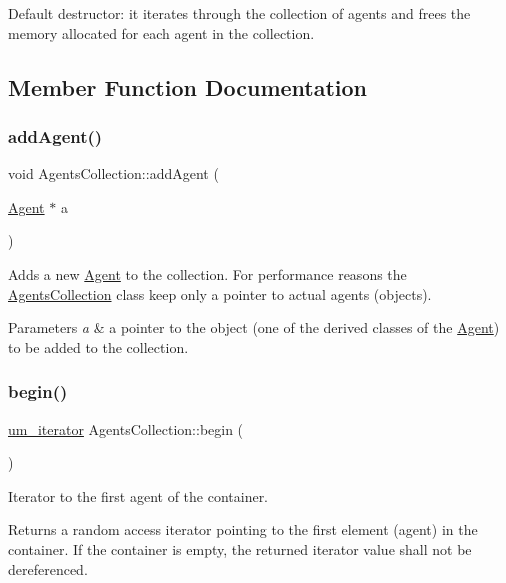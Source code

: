 Default destructor\+: it iterates through the collection of agents and frees the memory allocated for each agent in the collection. 

\subsection{Member Function Documentation}
\mbox{\label{class_agents_collection_a51d14d0635dedd5971ea90dec4f9e7f3}} 
\subsubsection{\texorpdfstring{addAgent()}{addAgent()}}
{\footnotesize\ttfamily void Agents\+Collection\+::add\+Agent (\begin{DoxyParamCaption}\item[{\mbox{\hyperlink{class_agent}{Agent}} $\ast$}]{a }\end{DoxyParamCaption})}

Adds a new \mbox{\hyperlink{class_agent}{Agent}} to the collection. For performance reasons the \mbox{\hyperlink{class_agents_collection}{Agents\+Collection}} class keep only a pointer to actual agents (objects). 
\begin{DoxyParams}{Parameters}
{\em a} & a pointer to the object (one of the derived classes of the \mbox{\hyperlink{class_agent}{Agent}}) to be added to the collection. \\
\hline
\end{DoxyParams}
\mbox{\label{class_agents_collection_abc1d6593a3ed1c1c7b2d31b7efec8db8}} 
\subsubsection{\texorpdfstring{begin()}{begin()}}
{\footnotesize\ttfamily \mbox{\hyperlink{_agents_collection_8h_afde47bc45d604b8b8c72755072376679}{um\+\_\+iterator}} Agents\+Collection\+::begin (\begin{DoxyParamCaption}{ }\end{DoxyParamCaption})}

Iterator to the first agent of the container. \begin{DoxyReturn}{Returns}
a random access iterator pointing to the first element (agent) in the container. If the container is empty, the returned iterator value shall not be dereferenced. 
\end{DoxyReturn}
\mbox{\label{class_agents_collection_afd4d2e005b5e449637abd0fa022132a9}} 
